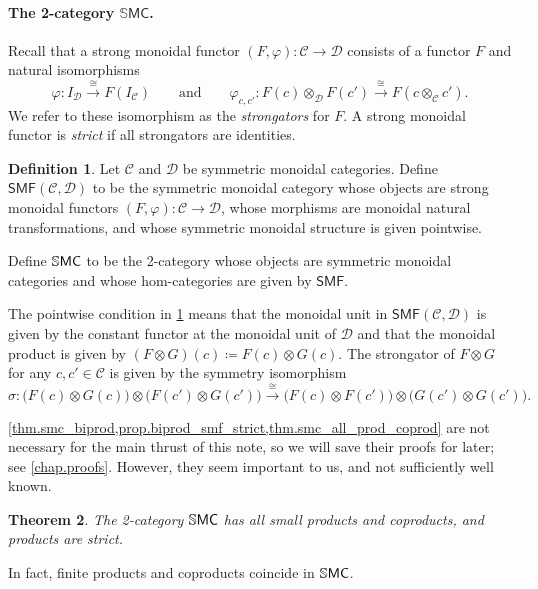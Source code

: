 \documentclass[11pt, oneside, article]{memoir}
\theoremstyle{plain}
\newtheorem{theorem}{Theorem}[chapter]
\theoremstyle{definition}
\newtheorem{definition}[theorem]{Definition}
\theoremstyle{remark}
\newcommand{\cat}[1]{\mathcal{#1}}%
\newcommand{\Cat}[1]{{\mathsf{#1}}}%
\newcommand{\CCat}[1]{\mathbb{\StrLeft{#1}{1}}\Cat{\StrGobbleLeft{#1}{1}}}%
\newcommand{\smf}{\Cat{SMF}}
\newcommand{\ssmc}{\CCat{SMC}}
\newcommand{\To}[1]{\xrightarrow{#1}}
\newcommand{\qqand}{\qquad\text{and}\qquad}
\begin{document}
\paragraph{The 2-category $\mathbb{S}\Cat{MC}$.}
Recall that a strong monoidal functor $(F,\varphi)\colon\cat{C}\to\cat{D}$ consists of a functor $F$ and natural isomorphisms
\[
	\varphi\colon I_{\cat{D}}\To{\cong} F(I_{\cat{C}})
	\qqand
	\varphi_{c,c'}\colon F(c)\otimes_{\cat{D}} F(c')\To{\cong} F(c\otimes_{\cat{C}} c').\]
	We refer to these isomorphism as the \emph{strongators} for $F$. A strong monoidal functor is \emph{strict} if all strongators are identities.

\begin{definition}\label{def.smf}
Let $\cat{C}$ and $\cat{D}$ be symmetric monoidal categories. Define $\smf(\cat{C},\cat{D})$ to be the symmetric monoidal category whose objects are strong monoidal functors $(F,\varphi)\colon\cat{C}\to\cat{D}$, whose morphisms are monoidal natural transformations, and whose symmetric monoidal structure is given pointwise.

Define $\ssmc$ to be the 2-category whose objects are symmetric monoidal categories and whose hom-categories are given by $\smf$.
\end{definition}

The pointwise condition in \cref{def.smf} means that the monoidal unit in $\smf(\cat{C},\cat{D})$ is given by the constant functor at the monoidal unit of $\cat{D}$ and that the monoidal product is given by $(F\otimes G)(c)\coloneqq F(c)\otimes G(c).$ The strongator of $F\otimes G$ for any $c,c'\in\cat{C}$ is given by the symmetry isomorphism
\[
	\sigma\colon
	\big(F(c)\otimes G(c)\big)\otimes\big(F(c')\otimes G(c')\big)
	\To{\cong}
	\big(F(c)\otimes F(c')\big)\otimes\big(G(c')\otimes G(c')\big).
\]

\cref{thm.smc_biprod,prop.biprod_smf_strict,thm.smc_all_prod_coprod} are not necessary for the main thrust of this note, so we will save their proofs for later; see \cref{chap.proofs}. %
However, they seem important to us, and not sufficiently well known. 

\begin{theorem}\label{thm.smc_all_prod_coprod}
The 2-category $\ssmc$ has all small products and coproducts, and products are strict.
\end{theorem}

In fact, finite products and coproducts coincide in $\ssmc$.
\end{document}
